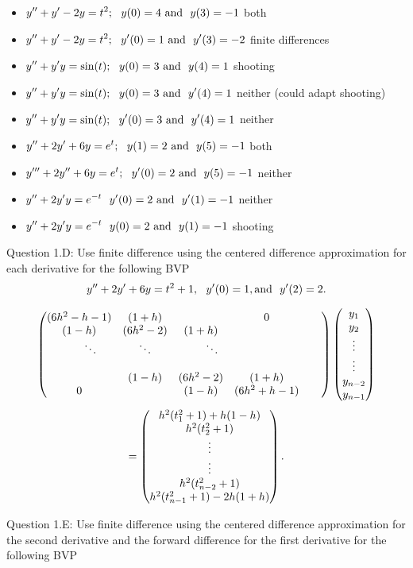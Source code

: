 \documentclass{article}
\def\ds{\displaystyle}
\begin{document}
\begin{itemize}
\item $\ds y'' + y' - 2y = t^2; \ \ y(0)=4 \ {\rm and}\ \ y(3)=-1$ {\color{teal} both}
\item $\ds y'' + y' - 2y = t^2; \ \ y'(0)=1 \ {\rm and}\ \ y'(3)=-2$ {\color{teal} finite differences}
\item $\ds y'' + y'y = \sin (t); \ \ y(0)=3 \ {\rm and}\ \ y(4)= 1$ {\color{teal} shooting}
\item $\ds y'' + y'y = \sin (t); \ \ y(0)=3 \ {\rm and}\ \ y'(4)= 1$ {\color{teal} neither (could adapt shooting)}
\item $\ds y'' + y'y = \sin (t); \ \ y'(0)=3 \ {\rm and}\ \ y'(4)= 1$ {\color{teal} neither}
\item $\ds y'' + 2 y' + 6 y = e^t; \ \ y(1)=2 \ {\rm and}\ \ y(5)= -1$ {\color{teal} both}
\item $\ds y''' + 2 y'' + 6 y = e^t; \ \ y'(0)=2 \ {\rm and}\ \ y(5)= -1$ {\color{teal} neither}
\item $\ds y'' + 2 y'y = e^{-t} \ \ y'(0)=2 \ {\rm and}\ \ y'(1)= -1$ {\color{teal} neither}
\item $\ds y'' + 2 y'y = e^{-t} \ \ y(0)=2 \ {\rm and}\ \ y(1)= -1$ {\color{teal} shooting}
\end{itemize}
\par \medskip \noindent 
%
Question 1.D: Use finite difference using the centered difference approximation for each derivative for the following BVP
$$y'' + 2y' + 6y = t^2 + 1, \ \ y'(0)=1, {\rm and} \ \ y'(2) = 2.$$
\par \noindent
{\color{teal}$$ \begin{pmatrix} (6h^2-h-1) & (1+h) &  &  0 \cr (1-h) & (6h^2-2) & (1+h) & & & \cr  \ \ \ \ \ \  \ddots & \ddots & \ \ \ \ \ \ \ddots &  & \cr  \cr & (1-h) & (6h^2-2) &  (1+h) \cr 0 &  & (1-h) & (6h^2+h-1) \end{pmatrix} \begin{pmatrix} y_1 \cr y_2 \cr \vdots \cr \vdots \cr y_{n-2} \cr y_{n-1}\end{pmatrix} $$
$$= \begin{pmatrix} h^2 (t_1^2+1)+h(1-h) \cr h^2(t_2^2+1) \cr \vdots \cr \vdots \cr h^2(t_{n-2}^2+1) \cr h^2(t_{n-1}^2+1)-2h(1+h)\end{pmatrix}.$$}
\par \medskip \noindent 
%
Question 1.E:  Use finite difference using the centered difference approximation for the second derivative and the forward difference for the first derivative for the following BVP
\end{document}
